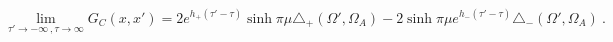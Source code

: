 \begin{equation}
\lim_{\tau'\rightarrow -\infty \ ,
\tau \rightarrow \infty}
G_C(x,x')=2e^{h_+(\tau'-\tau)}
\sinh \pi\mu \triangle_+(\Omega',\Omega_A)
-2\sinh \pi\mu e^{h_-(\tau'-\tau)}
\triangle_-(\Omega',\Omega_A) \ .
\end{equation}

